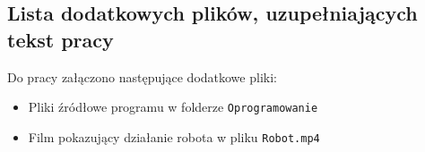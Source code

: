 \documentclass[a4paper,twoside,12pt]{book}
\begin{document}
\begin{appendices}



\chapter{Lista dodatkowych plików, uzupełniających tekst pracy} 

Do pracy załączono następujące dodatkowe pliki:
\begin{itemize}
	\item Pliki źródłowe programu w folderze \texttt{Oprogramowanie}
	\item Film pokazujący działanie robota w pliku \texttt{Robot.mp4}
	\end{itemize}



\listoffigures
{}

\end{appendices}
\end{document}
